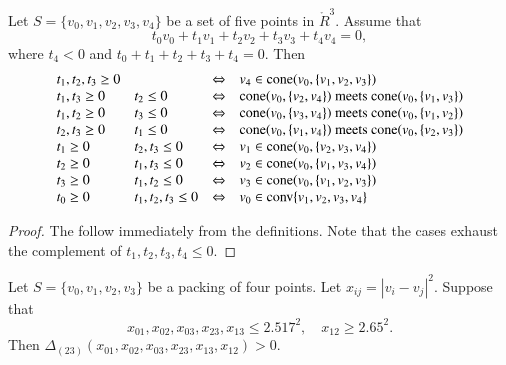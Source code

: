 \begin{tarskidata}
\begin{tarski}
\begin{lemma}
Let $S=\{v_0,v_1,v_2,v_3,v_4\}$ be a set of five points in
$\ring{R}^3$.
Assume that
   $$
   t_0 v_0 + t_1 v_1 + t_2 v_2 + t_3 v_3 + t_4 v_4 = 0,
   $$
where $t_4 < 0$ and $t_0+t_1+t_2+t_3+t_4=0$.
Then
   $$
   \def\lr{\Leftrightarrow}
   \def\m{ \text{ meets } }
   \def\cc{\op{cone}}
   \begin{array}{llcl}
  t_1,t_2,t_3\ge 0  &      &\lr& v_4\in\cc(v_0,\{v_1,v_2,v_3\})\\
  t_1,t_3\ge 0 & t_2\le 0  &\lr& \cc(v_0,\{v_2,v_4\})\m\cc(v_0,\{v_1,v_3\})\\
  t_1,t_2\ge 0 & t_3\le 0  &\lr& \cc(v_0,\{v_3,v_4\})\m\cc(v_0,\{v_1,v_2\})\\
  t_2,t_3\ge 0 & t_1\le 0  &\lr& \cc(v_0,\{v_1,v_4\})\m\cc(v_0,\{v_2,v_3\})\\
  t_1\ge0     & t_2,t_3\le0&\lr& v_1\in\cc(v_0,\{v_2,v_3,v_4\})\\
  t_2\ge0     & t_1,t_3\le0&\lr& v_2\in\cc(v_0,\{v_1,v_3,v_4\})\\
  t_3\ge0     & t_1,t_2\le0&\lr& v_3\in\cc(v_0,\{v_1,v_2,v_3\})\\
  t_0\ge0  &t_1,t_2,t_3\le0&\lr& v_0\in\op{conv}\{v_1,v_2,v_3,v_4\}\\
   \end{array}
   $$
\end{lemma}

\begin{proof}
The follow immediately from the definitions.
Note that the cases exhaust the complement of $t_1,t_2,t_3,t_4\le 0$.
\end{proof}
\end{tarski}








\begin{tarski}

\begin{lemma}
Let $S=\{v_0,v_1,v_2,v_3\}$ be a packing of four
points.
Let $x_{ij}=|v_i-v_j|^2$.
 Suppose that
$$
x_{01},x_{02},x_{03},x_{23},x_{13}\le 2.517^2,\quad x_{12}\ge 2.65^2.
$$
Then $\Delta_{(23)}(x_{01},x_{02},x_{03},x_{23},x_{13},x_{12})>0$.
\end{lemma}


\end{tarski}
\end{tarskidata}
